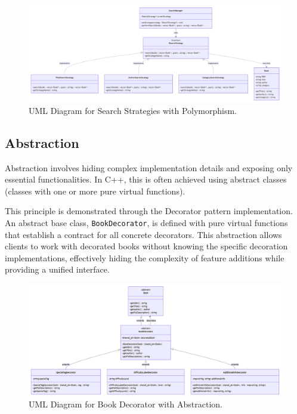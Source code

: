 \begin{figure}[H]
	\centering
	\includegraphics[width=1\textwidth]{figures/polymorphism.png}
	\caption{UML Diagram for Search Strategies with Polymorphism.}
	\label{fig:search_strategies_polymorphism}
\end{figure}

\subsection{Abstraction}
Abstraction involves hiding complex implementation details and exposing only essential functionalities. In C++, this is often achieved using abstract classes (classes with one or more pure virtual functions).

This principle is demonstrated through the Decorator pattern implementation. An abstract base class, \texttt{BookDecorator}, is defined with pure virtual functions that establish a contract for all concrete decorators. This abstraction allows clients to work with decorated books without knowing the specific decoration implementations, effectively hiding the complexity of feature additions while providing a unified interface.

\begin{figure}[H]
	\centering
	\includegraphics[width=1\textwidth]{figures/abstraction.png}
	\caption{UML Diagram for Book Decorator with Abstraction.}
	\label{fig:book_decorator_abstraction}
\end{figure}